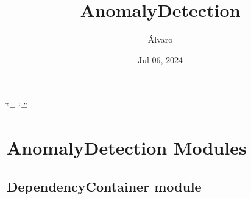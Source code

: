 \documentclass[letterpaper,10pt,english]{sphinxmanual}
\title{AnomalyDetection}
\date{Jul 06, 2024}
\author{Álvaro}
\begin{document}
\ifdefined\shorthandoff
  \ifnum\catcode`\=\string=\active\shorthandoff{=}\fi
  \ifnum\catcode`\"=\active{}\fi
\fi

\pagestyle{empty}
\sphinxmaketitle
\pagestyle{plain}
\sphinxtableofcontents
\pagestyle{normal}
\label{\detokenize{index::doc}}


\sphinxstepscope


\chapter{AnomalyDetection Modules}
\label{\detokenize{modules:anomalydetection-modules}}\label{\detokenize{modules::doc}}
\sphinxstepscope


\section{DependencyContainer module}
\label{\detokenize{DependencyContainer:module-DependencyContainer}}\label{\detokenize{DependencyContainer:dependencycontainer-module}}\label{\detokenize{DependencyContainer::doc}}
\end{document}
